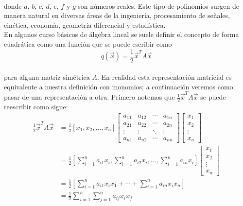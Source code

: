 \paragraph*{}
donde $a$, $b$, $c$, $d$, $e$, $f$ y $g$ son números reales. Este tipo de polinomios surgen de manera natural en diversas áreas de la ingeniería, procesamiento de señales, cinética, economía, geometría diferencial y estadística.\\
En algunos curso básicos de álgebra lineal se suele definir el concepto de forma cuadrática como una función que se puede escribir como
\begin{equation*}
q(\overrightarrow{x}) = \frac{1}{2} \overrightarrow{x}^{T} A \overrightarrow{x}
\end{equation*}
\paragraph*{}
para alguna matriz simétrica $A$. En realidad esta representación matricial es equivalente a nuestra definición con monomios; a continuación veremos como pasar de una representación a otra. Primero notemos que $\frac{1}{2} \overrightarrow{x}^{T} A \overrightarrow{x}$ se puede reescribir como sigue:
\begin{align*}
\frac{1}{2} \overrightarrow{x}^{T} A \overrightarrow{x} &= \frac{1}{2}[x_{1}, x_{2},\ldots,x_{n}] 
\begin{bmatrix}
a_{11} & a_{12} & \cdots & a_{1n}\\
a_{21} & a_{22} & \cdots & a_{2n}\\
\vdots & \vdots & \ddots & \vdots \\
a_{n1} & a_{n2} & \cdots & a_{nn}
\end{bmatrix} 
\begin{bmatrix}
x_{1}\\
x_{2}\\
\vdots\\
x_{n}
\end{bmatrix} \\ 
&= \frac{1}{2} \left[\sum_{i=1}^{n} a_{i1}x_{i}, \sum_{i=1}^{n} a_{i2}x_{i}, \ldots , \sum_{i=1}^{n} a_{in}x_{i} \right] 
\begin{bmatrix}
x_{1}\\
x_{2}\\
\vdots\\
x_{n}
\end{bmatrix} \\ 
&=   \frac{1}{2} \left[\sum_{i=1}^{n} a_{i1}x_{i}x_{1} + \cdots + \sum_{i=1}^{n} a_{in}x_{i}x_{n}\right]\\ 
&=   \frac{1}{2} \sum_{i=1}^{n}\sum_{j=1}^{n} a_{ij}x_{i}x_{j}
\end{align*}
